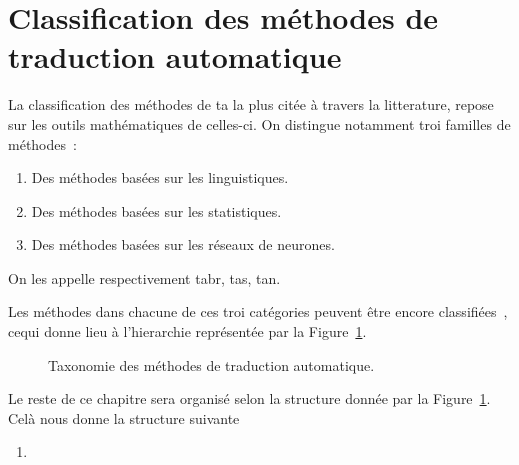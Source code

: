 \section{Classification des méthodes de traduction automatique}

La classification des méthodes de \acrshort{ta} la plus citée à travers la litterature, 
repose sur les outils mathématiques de celles-ci.
On distingue notamment troi familles de méthodes~\cite{deep-nmt-survey}:
\begin{enumerate}
    \item Des méthodes basées sur les linguistiques.
    \item Des méthodes basées sur les statistiques.
    \item Des méthodes basées sur les réseaux de neurones.
\end{enumerate}

On les appelle respectivement \Acrfull{tabr}, \Acrfull{tas}, \Acrfull{tan}.

Les méthodes dans chacune de ces troi catégories peuvent être encore classifiées~\cite{deep-nmt-survey,hybrid-mt},
cequi donne lieu à l'hierarchie représentée par la Figure~\ref{fig:mt-taxonomy-tree}.

\begin{figure}
    \begin{center}
       \resizebox{\textwidth}{!}{
         
       }
    \end{center}
    \caption{Taxonomie des méthodes de traduction automatique.}
    \label{fig:mt-taxonomy-tree}
\end{figure}

Le reste de ce chapitre sera organisé selon la structure donnée par la Figure~\ref{fig:mt-taxonomy-tree}. 
Celà nous donne la structure suivante

\begin{enumerate}
    \item 
\end{enumerate}
